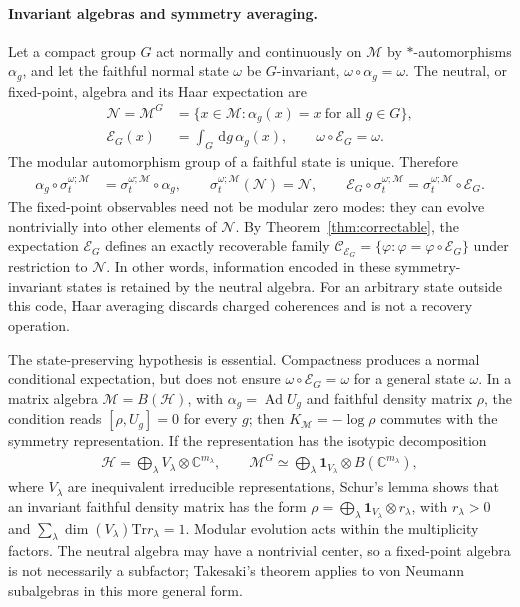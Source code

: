 \documentclass[a4paper,11pt]{article}
\theoremstyle{definition}
\newcommand{\dd}{\,\mathrm{d}}
\newcommand{\cH}{\mathcal{H}}
\newcommand{\Tr}{\text{Tr}}
\newcommand{\mN}{\mathcal{N}}
\newcommand{\mM}{\mathcal{M}}
\newcommand{\mE}{\mathcal{E}}
\begin{document}
\paragraph{Invariant algebras and symmetry averaging.}
Let a compact group $G$ act normally and continuously on $\mM$ by
$*$-automorphisms $\alpha_g$, and let the faithful normal state $\omega$
be $G$-invariant, $\omega\circ\alpha_g=\omega$. The neutral, or
fixed-point, algebra and its Haar expectation are
\begin{align}
 \mN=\mM^G
 &=\{x\in\mM:\alpha_g(x)=x\ \text{for all }g\in G\},\nonumber\\
 \mE_G(x)&=\int_G\!\dd g\,\alpha_g(x),
 \qquad \omega\circ\mE_G=\omega .
 \label{eq:symmetry-Haar-expectation}
\end{align}
The modular automorphism group of a faithful state is unique. Therefore
\begin{align}
 \alpha_g\circ\sigma_t^{\omega;\mM}
 &=\sigma_t^{\omega;\mM}\circ\alpha_g,
 \qquad
 \sigma_t^{\omega;\mM}(\mN)=\mN,
 \qquad
 \mE_G\circ\sigma_t^{\omega;\mM}
 =\sigma_t^{\omega;\mM}\circ\mE_G .
 \label{eq:symmetry-modular-intertwining}
\end{align}
The fixed-point observables need not be modular zero modes: they can evolve
nontrivially into other elements of $\mN$. By Theorem~\ref{thm:correctable},
the expectation $\mE_G$ defines an exactly recoverable family
$\mathcal C_{\mE_G}=\{\varphi:\varphi=\varphi\circ\mE_G\}$ under
restriction to $\mN$. In other words, information encoded in these
symmetry-invariant states is retained by the neutral algebra. For an
arbitrary state outside this code, Haar averaging discards charged
coherences and is not a recovery operation.

The state-preserving hypothesis is essential. Compactness produces a
normal conditional expectation, but does not ensure
$\omega\circ\mE_G=\omega$ for a general state $\omega$. In a matrix
algebra $\mM=B(\cH)$, with $\alpha_g=\operatorname{Ad}U_g$ and faithful
density matrix $\rho$, the condition reads $[\rho,U_g]=0$ for every $g$;
then $K_{\mM}=-\log\rho$ commutes with the symmetry representation. If the
representation has the isotypic decomposition
\begin{align}
 \cH=\bigoplus_{\lambda} V_\lambda\otimes\mathbb C^{m_\lambda},
 \qquad
 \mM^G\simeq\bigoplus_{\lambda}
       \mathbf 1_{V_\lambda}\otimes B(\mathbb C^{m_\lambda}),
 \label{eq:symmetry-isotypic}
\end{align}
where $V_\lambda$ are inequivalent irreducible representations, Schur's
lemma shows that an invariant faithful density matrix has the form
$\rho=\bigoplus_\lambda\mathbf1_{V_\lambda}\otimes r_\lambda$,
with $r_\lambda>0$ and $\sum_\lambda\dim(V_\lambda)\Tr r_\lambda=1$.
Modular evolution acts within the multiplicity factors. The neutral
algebra may have a nontrivial center, so a fixed-point algebra is not
necessarily a subfactor; Takesaki's theorem applies to von Neumann
subalgebras in this more general form.
\end{document}

